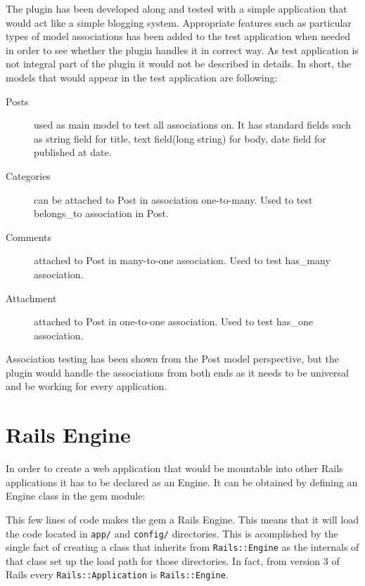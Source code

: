     The plugin has been developed along and tested with a simple application that would act like a simple blogging
    system. Appropriate features such as particular types of model associations has been added to the test application
    when needed in order to see whether the plugin handles it in correct way. As test application is not integral 
    part of the plugin it would not be described in details. In short, the models that would appear in the test application are
    following:
      \begin{description}
        \item[Posts] used as main model to test all associations on. It has standard fields such as string field for title,
          text field(long string) for body, date field for published at date.
        \item[Categories] can be attached to Post in association one-to-many. Used to test belongs\_to association in Post.
        \item[Comments] attached to Post in many-to-one association. Used to test has\_many association.
        \item[Attachment] attached to Post in one-to-one association. Used to test has\_one association.
      \end{description}
      
    Association testing has been shown from the Post model perspective, but the plugin would handle the associations
    from both ends as it needs to be universal and be working for every application.
    
  \section{Rails Engine}
    In order to create a web application that would be mountable into other Rails applications it has to be
    declared as an Engine. It can be obtained by defining an Engine class in the gem module:
    
    
    
    This few lines of code makes the gem a Rails Engine. This means that it will load the code located in \texttt{app/} and 
    \texttt{config/} directories. This is acomplished by the single fact of creating a class that inherits from \texttt{Rails::Engine}
    as the internals of that class set up the load path for those directories. In fact, from version 3 of Rails every
    \texttt{Rails::Application} is \texttt{Rails::Engine}.
    
